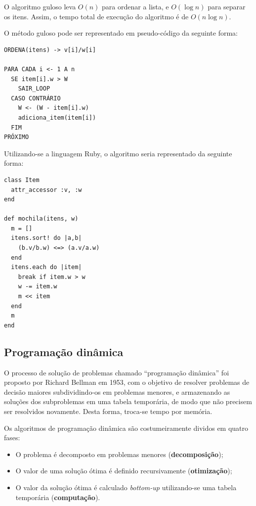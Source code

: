\documentclass[a4paper,twocolumn]{article}
\begin{document}
O algoritmo guloso leva $O(n)$ para ordenar a lista, e $O(\log n)$ para separar os itens. Assim, o tempo total de execução do algoritmo é de $O(n\log n)$.

O método guloso pode ser representado em pseudo-código da seguinte forma:

\begin{samepage}
\begin{verbatim}
ORDENA(itens) -> v[i]/w[i]

PARA CADA i <- 1 A n
  SE item[i].w > W
    SAIR_LOOP
  CASO CONTRÁRIO
    W <- (W - item[i].w)
    adiciona_item(item[i])
  FIM
PRÓXIMO
\end{verbatim}
\end{samepage}

Utilizando-se a linguagem Ruby, o algoritmo seria representado da seguinte forma:

\begin{samepage}
\begin{verbatim}
class Item
  attr_accessor :v, :w
end

def mochila(itens, w)
  m = []
  itens.sort! do |a,b| 
    (b.v/b.w) <=> (a.v/a.w)
  end
  itens.each do |item|
    break if item.w > w
    w -= item.w
    m << item
  end
  m
end
\end{verbatim}
\end{samepage}


\subsection{Programação dinâmica}

O processo de solução de problemas chamado ``programação dinâmica'' foi proposto por Richard Bellman em 1953, com o objetivo de resolver problemas de decisão maiores subdividindo-os em problemas menores, e armazenando as soluções dos subproblemas em uma tabela temporária, de modo que não precisem ser resolvidos novamente. Desta forma, troca-se tempo por memória\cite{bellman1954theory}.

Os algoritmos de programação dinâmica são costumeiramente dividos em quatro fases:

\begin{itemize}
\item O problema é decomposto em problemas menores (\textbf{decomposição});
\item O valor de uma solução ótima é definido recursivamente (\textbf{otimização});
\item O valor da solução ótima é calculado {\em bottom-up} utilizando-se uma tabela temporária (\textbf{computação}).
\end{itemize}
\end{document}
